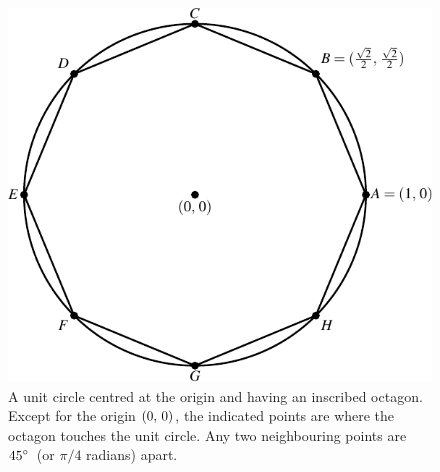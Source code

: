 \documentclass[a4paper,oneside,12pt]{article}
\begin{document}
\begin{figure}[!htbp]
\centering
\includegraphics[scale=1.1]{image/05/circle-octagon.pdf}
\caption{%
  A unit circle centred at the origin and having an inscribed
  octagon.  Except for the origin $\left\lparen{0},\, {0}\right\rparen$, the indicated points
  are where the octagon touches the unit circle.  Any two neighbouring
  points are ${45}^{\circ}$~(or $\pi / 4$ radians) apart.
}
\label{fig:circle_inscribed_octagon}
\end{figure}
\end{document}
